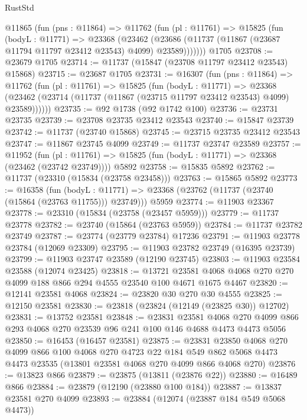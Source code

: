 \begin{lexlean}{RustStd}
\begin{coremodule}
    @11865
      (fun (pns : @11864) =>
      @11762
        (fun (pl : @11761) =>
        @15825
          (fun (bodyL : @11771) =>
          @23368
            (@23462
              (@23686 (@11737 (@11867 (@23687 @11794 @11797 @23412 @23543) @4099) @23589)))))))
    @1705
@23708 := @23679 @1705
@23714 := @11737 (@15847 (@23708 @11797 @23412 @23543) @15868)
@23715 := @23687 @1705
@23731 := @16307
    (fun (pns : @11864) =>
    @11762
      (fun (pl : @11761) =>
      @15825
        (fun (bodyL : @11771) =>
        @23368 (@23462 (@23714 (@11737 (@11867 (@23715 @11797 @23412 @23543) @4099) @23589))))))
@23735 := @92 @1738 (@92 @1742 @100)
@23736 := @23731 @23735
@23739 := @23708 @23735 @23412 @23543
@23740 := @15847 @23739
@23742 := @11737 (@23740 @15868)
@23745 := @23715 @23735 @23412 @23543
@23747 := @11867 @23745 @4099
@23749 := @11737 @23747 @23589
@23757 := @11952
    (fun (pl : @11761) => @15825 (fun (bodyL : @11771) => @23368 (@23462 (@23742 @23749))))
    @5892
@23758 := @15835 @5892
@23762 := @11737 (@23310 (@15834 (@23758 @23458)))
@23763 := @15865 @5892
@23773 := @16358
    (fun (bodyL : @11771) => @23368 (@23762 (@11737 (@23740 (@15864 (@23763 @11755))) @23749)))
    @5959
@23774 := @11903 @23367
@23778 := @23310 (@15834 (@23758 (@23457 @5959)))
@23779 := @11737 @23778
@23782 := @23740 (@15864 (@23763 @5959))
@23784 := @11737 @23782 @23749
@23787 := @23774 (@23779 @23784) @17236
@23791 := @11903 @23778 @23784 (@12069 @23309)
@23795 := @11903 @23782 @23749 (@16395 @23739)
@23799 := @11903 @23747 @23589 (@12190 @23745)
@23803 := @11903 @23584 @23588 (@12074 @23425)
@23818 := @13721
    @23581
    @4068
    @4068
    @270
    @270
    @4099
    @188
    @866
    @294
    @4555
    @23540
    @100
    @4671
    @1675
    @4467
@23820 := @12141 @23581 @4068
@23824 := @23820 @30 @270 @30 @4555
@23825 := @12150 @23581
@23830 := @23818 (@23824 (@12149 (@23825 @30)) @12702)
@23831 := @13752 @23581
@23848 := @23831
    @23581
    @4068
    @270
    @4099
    @866
    @293
    @4068
    @270
    @23539
    @96
    @241
    @100
    @146
    @4688
    @4473
    @4473
    @5056
@23850 := @16453 (@16457 @23581)
@23875 := @23831
    @23850
    @4068
    @270
    @4099
    @866
    @100
    @4068
    @270
    @4723
    @22
    @184
    @549
    @862
    @5068
    @4473
    @4473
    @23535
    (@13801 @23581 @4068 @270 @4099 @866 @4068 @270)
@23876 := @13823 @866
@23879 := @23875 (@13811 (@23876 @22))
@23880 := @16489 @866
@23884 := @23879 (@12190 (@23880 @100 @184))
@23887 := @13837 @23581 @270 @4099
@23893 := @23884 (@12074 (@23887 @184 @549 @5068 @4473))

\end{coremodule}
\end{lexlean}
